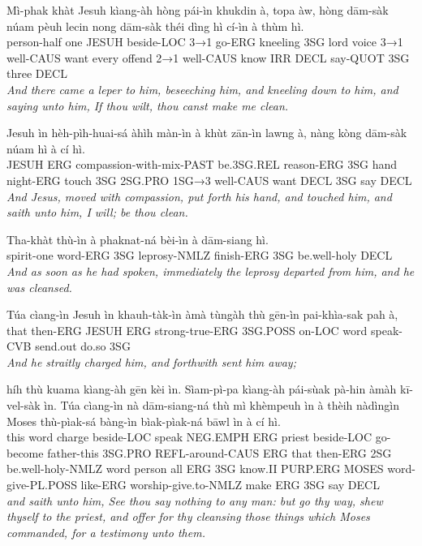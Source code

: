 \documentclass[11pt,a4paper]{article}
\begin{document}
\begin{exe}
\gll Mì-phak khàt Jesuh kìang-àh hòng pái-ìn khukdin à, topa àw, hòng dām-sàk núam pèuh lecin nong dām-sàk théi dìng hì cí-ìn à thùm hì. \\
     person-half one JESUH beside-LOC 3→1 go-ERG kneeling 3SG lord voice 3→1 well-CAUS want every offend 2→1 well-CAUS know IRR DECL say-QUOT 3SG three DECL \\
\glt \textcolor{kjvcolor}{\textit{And there came a leper to him, beseeching him, and kneeling down to him, and saying unto him, If thou wilt, thou canst make me clean.}}

\gll Jesuh ìn hèh-pìh-huai-sá àhìh màn-ìn à khùt zān-ìn lawng à, nàng kòng dām-sàk núam hì à cí hì. \\
     JESUH ERG compassion-with-mix-PAST be.3SG.REL reason-ERG 3SG hand night-ERG touch 3SG 2SG.PRO 1SG→3 well-CAUS want DECL 3SG say DECL \\
\glt \textcolor{kjvcolor}{\textit{And Jesus, moved with compassion, put forth his hand, and touched him, and saith unto him, I will; be thou clean.}}

\gll Tha-khàt thù-ìn à phaknat-ná bèi-ìn à dām-siang hì. \\
     spirit-one word-ERG 3SG leprosy-NMLZ finish-ERG 3SG be.well-holy DECL \\
\glt \textcolor{kjvcolor}{\textit{And as soon as he had spoken, immediately the leprosy departed from him, and he was cleansed.}}

\gll Túa cìang-ìn Jesuh ìn khauh-tàk-ìn àmà tùngàh thù gēn-ìn pai-khìa-sak pah à, \\
     that then-ERG JESUH ERG strong-true-ERG 3SG.POSS on-LOC word speak-CVB send.out do.so 3SG \\
\glt \textcolor{kjvcolor}{\textit{And he straitly charged him, and forthwith sent him away;}}

\gll híh thù kuama kìang-àh gēn kèi ìn. Sìam-pì-pa kìang-àh pái-sùak pà-hin àmàh kī-vel-sàk ìn. Túa cìang-ìn nà dām-siang-ná thù mì khèmpeuh ìn à thèih nàdìngìn Moses thù-pìak-sá bàng-ìn bìak-pìak-ná bāwl ìn à cí hì. \\
     this word charge beside-LOC speak NEG.EMPH ERG priest beside-LOC go-become father-this 3SG.PRO REFL-around-CAUS ERG that then-ERG 2SG be.well-holy-NMLZ word person all ERG 3SG know.II PURP.ERG MOSES word-give-PL.POSS like-ERG worship-give.to-NMLZ make ERG 3SG say DECL \\
\glt \textcolor{kjvcolor}{\textit{and saith unto him, See thou say nothing to any man: but go thy way, shew thyself to the priest, and offer for thy cleansing those things which Moses commanded, for a testimony unto them.}}


\end{exe}
\end{document}
